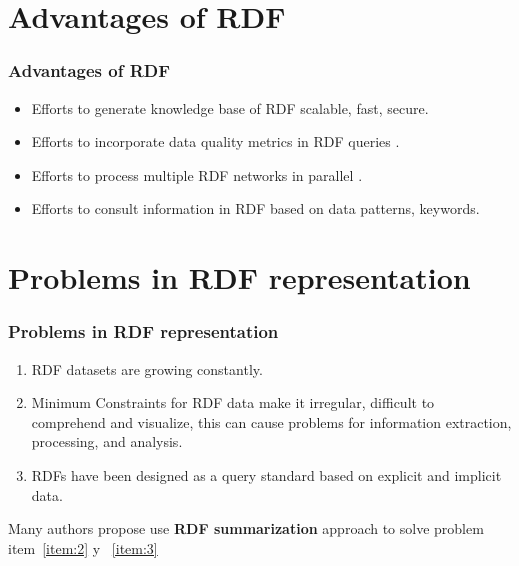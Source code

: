 \documentclass{beamer}
\numberwithin{figure}{section}
\numberwithin{equation}{section}
\begin{document}
\section{Advantages of RDF}
\begin{frame}
 \frametitle{Advantages of RDF}
 \begin{itemize}
	\scriptsize
  	\item Efforts to generate knowledge base of RDF scalable, fast, secure\cite{Ren2018}.
    \vspace{2.5mm}
  	\item Efforts to incorporate data quality metrics in RDF queries \cite{Zneika2016}\cite{Cheng2012}\cite{Bursztyn2014}.
    \vspace{2.5mm}
  	\item  Efforts to process multiple RDF networks in parallel \cite{Doel2017}\cite{Kushwaha2015}.
    \vspace{2.5mm}
    \item  Efforts to consult information in RDF based on data patterns, keywords\cite{Kushwaha2015}.
 \end{itemize}
 
\end{frame}


\section{Problems in RDF representation}
\begin{frame}
 \frametitle{Problems in RDF representation}
 \begin{enumerate}
	\scriptsize
  	\item RDF datasets are growing constantly.
    \vspace{2.5mm}
  	\item Minimum Constraints for RDF data make it irregular, difficult to comprehend and visualize, this can cause problems for information extraction, processing, and analysis.\label{item:2}
    \vspace{2.5mm}
  	\item  RDFs have been designed as a query standard based on explicit and implicit data.\label{item:3}
 \end{enumerate}
 \vspace{5mm}
 \centering
 Many authors propose use \textbf{RDF summarization} approach to solve problem  item~\ref{item:2} y ~\ref{item:3}
 
 
\end{frame}
\end{document}
